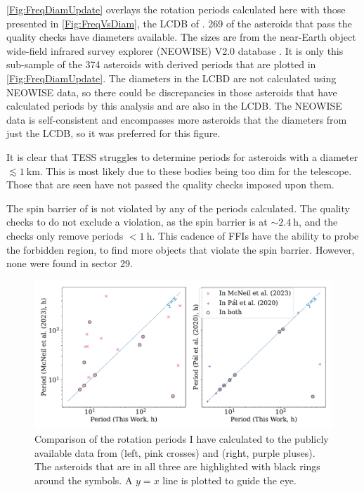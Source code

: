 \documentclass{UCreport}
\begin{document}
\autoref{Fig:FreqDiamUpdate} overlays the rotation periods calculated here with those presented in \autoref{Fig:FreqVsDiam}, the LCDB of \citet{Warner2009}.
269 of the asteroids that pass the quality checks have diameters available. 
The sizes are from the near-Earth object wide-field infrared survey explorer (NEOWISE) V2.0 database \citep{Masiero2011, NEOWISE2019}.
It is only this sub-sample of the 374 asteroids with derived periods that are plotted in \autoref{Fig:FreqDiamUpdate}.
The diameters in the LCBD are not calculated using NEOWISE data, so there could be discrepancies in those asteroids that have calculated periods by this analysis and are also in the LCDB.
The NEOWISE data is self-consistent and encompasses more asteroids that the diameters from just the LCDB, so it was preferred for this figure.

It is clear that TESS struggles to determine periods for asteroids with a diameter $\lesssim \qty{1}{\kilo \metre}$.
This is most likely due to these bodies being too dim for the telescope.
Those that are seen have not passed the quality checks imposed upon them.

The spin barrier of \citet{Pravec2000} is not violated by any of the periods calculated.
The quality checks to do not exclude a violation, as the spin barrier is at $\sim \qty{2.4}{\hour}$, and the checks only remove periods $<\qty{1}{\hour}$.
This cadence of FFIs have the ability to probe the forbidden region, to find more objects that violate the spin barrier.
However, none were found in sector 29.

\begin{figure}[!t]
  \centering
  \includegraphics[width=\textwidth]{./Figures/M23andP20Comp.pdf}
  \caption[Comparison to TESS periods from the Literature]{Comparison of the rotation periods I have calculated to the publicly available data from \citet{McNeill2023} (left, pink crosses) and \citet{Pal2020} (right, purple pluses). The asteroids that are in all three are highlighted with black rings around the symbols.
    A $y=x$ line is plotted to guide the eye.}
  \label{Fig:TESSLit}
\end{figure}
\end{document}
